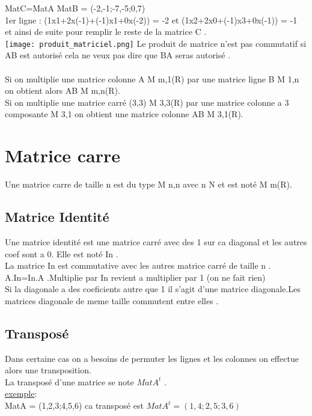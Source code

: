 \documentclass[a4paper,8pt,openany]{book}
\begin{document}
MatC=MatA \times MatB = (-2,-1;-7,-5;0,7)\\
1er ligne : (1x1+2x(-1)+(-1)x1+0x(-2)) = -2 et (1x2+2x0+(-1)x3+0x(-1)) = -1 \\
et ainsi de suite pour remplir le reste de la matrice C .\\
\texttt{[image: produit\_matriciel.png]}
Le produit de matrice n'est pas commutatif si AB est autorisé cela ne veux pas dire que BA seras autorisé .\\
\\
Si on multiplie une matrice colonne A \in M m,1(R) par une matrice ligne B \in M 1,n on obtient alors AB \in M m,n(R).\\
Si on multiplie une matrice carré (3,3) M 3,3(R) par une matrice colonne a 3 composante M 3,1 on obtient une matrice colonne AB \in M 3,1(R).\\


\chapter{Matrice carre}
Une matrice carre de taille n est du type M n,n avec n \in N et est noté M m(R).\\

\section{Matrice Identité}
Une matrice identité est une matrice carré avec des 1 sur ca diagonal et les autres coef sont a 0. Elle est noté In .\\
La matrice In est commutative avec les autres matrice carré de taille n . A.In=In.A .Multiplie par In revient a multiplier par 1 (on ne fait rien) \\
Si la diagonale a des coeficients autre que 1 il s'agit d'une matrice diagonale.Les matrices diagonale de meme taille commutent entre elles .\\

\section{Transposé}
Dans certaine cas on a besoins de permuter les lignes et les colonnes on effectue alors une transposition.\\
La transposé d'une matrice se note $MatA^t$ .\\
\underline{exemple}:\\
MatA = (1,2,3;4,5,6) ca transposé est $MatA^t = (1,4;2,5;3,6)$
\end{document}
